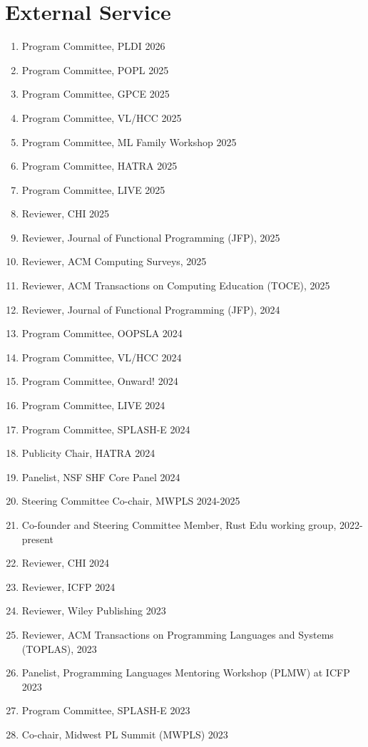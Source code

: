 \documentclass[10pt,letterpaper]{article}
\begin{document}
\section*{External Service}
\begin{enumerate}
  \item Program Committee, PLDI 2026
  \item Program Committee, POPL 2025
  \item Program Committee, GPCE 2025
  \item Program Committee, VL/HCC 2025
  \item Program Committee, ML Family Workshop 2025
  \item Program Committee, HATRA 2025
  \item Program Committee, LIVE 2025
  \item Reviewer, CHI 2025
  \item Reviewer, Journal of Functional Programming (JFP), 2025
  \item Reviewer, ACM Computing Surveys, 2025
  \item Reviewer, ACM Transactions on Computing Education	(TOCE), 2025
  \item Reviewer, Journal of Functional Programming (JFP), 2024
  \item Program Committee, OOPSLA 2024
  \item Program Committee, VL/HCC 2024
  \item Program Committee, Onward! 2024
  \item Program Committee, LIVE 2024
  \item Program Committee, SPLASH-E 2024
  \item Publicity Chair, HATRA 2024
  \item Panelist, NSF SHF Core Panel 2024
  \item Steering Committee Co-chair, MWPLS 2024-2025
  \item Co-founder and Steering Committee Member, Rust Edu working group, 2022-present
  \item Reviewer, CHI 2024
  \item Reviewer, ICFP 2024
  \item Reviewer, Wiley Publishing 2023
  \item Reviewer, ACM Transactions on Programming Languages and Systems (TOPLAS), 2023
  \item Panelist, Programming Languages Mentoring Workshop (PLMW) at ICFP 2023
  \item Program Committee, SPLASH-E 2023
  \item Co-chair, Midwest PL Summit (MWPLS) 2023

\end{enumerate}
\end{document}
